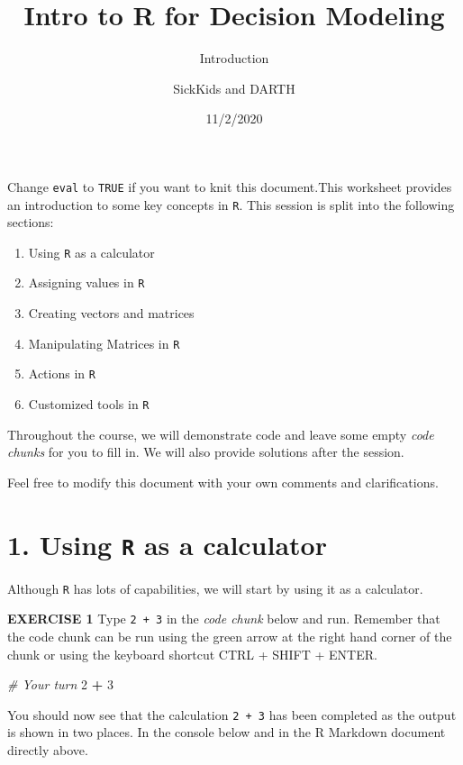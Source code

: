 \documentclass[
]{article}
\title{Intro to R for Decision Modeling}
\subtitle{Introduction}
\author{SickKids and DARTH}
\date{11/2/2020}
\newenvironment{Shaded}{\begin{snugshade}}{\end{snugshade}}
\newcommand{\CommentTok}[1]{\textcolor[rgb]{0.56,0.35,0.01}{\textit{#1}}}
\newcommand{\DecValTok}[1]{\textcolor[rgb]{0.00,0.00,0.81}{#1}}
\newcommand{\OperatorTok}[1]{\textcolor[rgb]{0.81,0.36,0.00}{\textbf{#1}}}
\newcommand{\StringTok}[1]{\textcolor[rgb]{0.31,0.60,0.02}{#1}}
\begin{document}
\maketitle

Change \texttt{eval} to \texttt{TRUE} if you want to knit this
document.This worksheet provides an introduction to some key concepts in
\texttt{R}. This session is split into the following sections:

\begin{enumerate}
\def\labelenumi{\arabic{enumi}.}
\item
  Using \texttt{R} as a calculator
\item
  Assigning values in \texttt{R}
\item
  Creating vectors and matrices
\item
  Manipulating Matrices in \texttt{R}
\item
  Actions in \texttt{R}
\item
  Customized tools in \texttt{R}
\end{enumerate}

Throughout the course, we will demonstrate code and leave some empty
\emph{code chunks} for you to fill in. We will also provide solutions
after the session.

Feel free to modify this document with your own comments and
clarifications.

\hypertarget{using-r-as-a-calculator}{%
\section{\texorpdfstring{1. Using \texttt{R} as a
calculator}{1. Using R as a calculator}}\label{using-r-as-a-calculator}}

Although \texttt{R} has lots of capabilities, we will start by using it
as a calculator.

\textbf{EXERCISE 1} Type \texttt{2\ +\ 3} in the \emph{code chunk} below
and run. Remember that the code chunk can be run using the green arrow
at the right hand corner of the chunk or using the keyboard shortcut
CTRL + SHIFT + ENTER.

\begin{Shaded}
\begin{Highlighting}[]
\CommentTok{# Your turn}
\DecValTok{2} \OperatorTok{+}\StringTok{ }\DecValTok{3}
\end{Highlighting}
\end{Shaded}

You should now see that the calculation \texttt{2\ +\ 3} has been
completed as the output is shown in two places. In the console below and
in the R Markdown document directly above.
\end{document}
